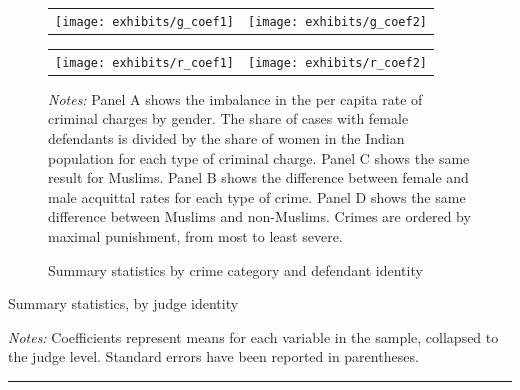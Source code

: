 \documentclass[12pt,english]{article}
\begin{document}
    \begin{figure}
      \centering
      \caption{Summary statistics by
        crime category and defendant identity}
      \label{fig:summary}
            \begin{tabular}{@{}ll@{}}
        \texttt{[image: exhibits/g\_coef1]} &
        \texttt{[image: exhibits/g\_coef2]} \\
      \end{tabular}
      \begin{tabular}{@{}ll@{}}
        \texttt{[image: exhibits/r\_coef1]} &
        \texttt{[image: exhibits/r\_coef2]} \\
      \end{tabular}
      
  \begin{minipage}{1.0\textwidth}
    {\scriptsize \emph{Notes:}       Panel A shows the imbalance in the per capita rate of criminal charges by gender.  The share of cases with female defendants is divided by the share of women in the Indian population for each type of criminal charge. Panel C shows the same result for Muslims. Panel B shows the difference between female and male acquittal rates for each type of crime. Panel D shows the same difference between Muslims and non-Muslims. Crimes are ordered by maximal punishment, from most to least severe.


 \par}
   \end{minipage}
  \end{figure}


  \begin{table}[ht]
    \begin{center}
      \caption{Summary statistics, by judge identity}
      \label{tab:judge_sam}
     
    \begin{minipage}{0.95\textwidth}
    {\footnotesize \vspace{1mm}\emph{Notes:} Coefficients represent means for each variable in the sample, collapsed to the judge level. Standard errors have been reported in parentheses. \par} \vspace{1mm} 
    \hrule
   \end{minipage}
    \end{center}
  \end{table}
\end{document}
